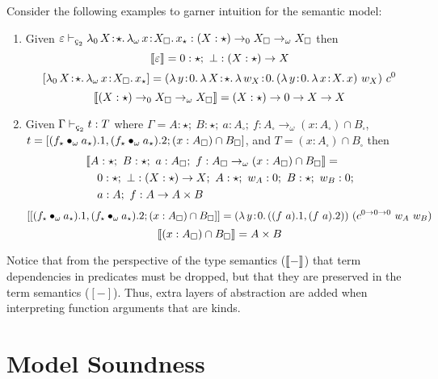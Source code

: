 Consider the following examples to garner intuition for the semantic model:
\begin{enumerate}
    \item {
        Given $\varepsilon \vdash_{\ced} \abs{\lambda_0}{X}{\star}{
            \abs{\lambda_\omega}{x}{X_\square}{x_\star}
        } : (X : \star) \to_0 X_\square \to_\omega X_\square$
        then $$\llbracket \varepsilon \rrbracket = 0 : \star;\ \bot : (X : \star) \to X$$
        $$[\abs{\lambda_0}{X}{\star}{
            \abs{\lambda_\omega}{x}{X_\square}{x_\star}
        }] = (\abs{\lambda}{y}{0}{
            \abs{\lambda}{X}{\star}{
                \abs{\lambda}{w_X}{0}{
                    (\abs{\lambda}{y}{0}
                        \abs{\lambda}{x}{X}{x}
                    )\ w_X
                }
            }
        })\ c^0$$
        $$\llbracket (X : \star) \to_0 X_\square \to_\omega X_\square \rrbracket
            = (X : \star) \to 0 \to X \to X$$
    }
    \item {
        Given $\Gamma \vdash_{\ced} t : T$ where $\Gamma = A : \star;\ B : \star;\ a : A_\square;\ f : A_\square \to_\omega (x : A_\square) \cap B_\square$, $t = [(f_\star \bullet_{\omega} a_\star).1, (f_\star \bullet_{\omega} a_\star).2; (x : A_\square) \cap B_\square]$, and $T = (x : A_\square) \cap B_\square$ then
        \begin{align*}
            &\llbracket A : \star;\ B : \star;\ a : A_\square;\ f : A_\square \to_\omega (x : A_\square) \cap B_\square \rrbracket =\\
            &\quad 0 : \star;\ \bot : (X : \star) \to X;\ A : \star;\ w_A : 0;\ B : \star;\ w_B : 0; \\
            &\quad a : A;\ f : A \to A \times B
        \end{align*}
            $$[[(f_\star \bullet_{\omega} a_\star).1, (f_\star \bullet_{\omega} a_\star).2; (x : A_\square) \cap B_\square]] = ({\lambda}\, y\! : \! 0.\, 
                ((f\ a).1, (f\ a).2)
           )\ (c^{0 \to 0 \to 0}\ w_A\ w_B)$$
        $$\llbracket (x : A_\square) \cap B_\square \rrbracket = A \times B$$
    }
\end{enumerate}

Notice that from the perspective of the type semantics ($\llbracket - \rrbracket$) that term dependencies in predicates must be dropped, but that they are preserved in the term semantics ($[-]$).
Thus, extra layers of abstraction are added when interpreting function arguments that are kinds.

\section{Model Soundness}

